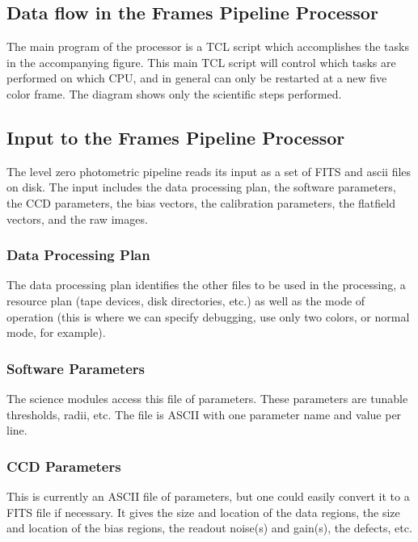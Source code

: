 \subsection{Data flow in the Frames Pipeline Processor}

	The main program of the processor is a TCL script which accomplishes
the tasks in the accompanying figure.  This main TCL script will control
which tasks are performed on which CPU, and in general can only be restarted 
at a new five color frame.  The diagram shows only the scientific steps
performed.


\subsection{Input to the Frames Pipeline Processor}

	The level zero photometric pipeline reads its input as a
set of FITS and ascii files on disk.  The input includes the data
processing plan, the software parameters, the CCD parameters, the bias
vectors, the calibration parameters, the flatfield vectors, and the
raw images.

\subsubsection{Data Processing Plan}

	The data processing plan identifies the other files to be used in
the processing, a resource plan (tape
devices, disk directories, etc.) as well as the mode of operation (this is
where we can specify debugging, use only two colors, or
normal mode, for example).

\subsubsection{Software Parameters}

The science modules access this file of parameters.  These parameters are
tunable thresholds, radii, etc.  The file is ASCII with one parameter name
and value per line.

\subsubsection{CCD Parameters}

This is currently an ASCII file of parameters, but one could easily
convert it to a FITS file if necessary.  It gives the size and location
of the data regions, the size and location of the bias regions, the
readout noise(s) and gain(s), the defects, etc.

